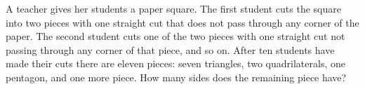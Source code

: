 A teacher gives her students a paper square. The first student cuts the square into two pieces with one straight cut that does not pass through any corner of the paper. The second student cuts one of the two pieces with one straight cut not passing through any corner of that piece, and so on. After ten students have made their cuts there are eleven pieces: seven triangles, two quadrilaterals, one pentagon, and one more piece. How many sides does the remaining piece have?
